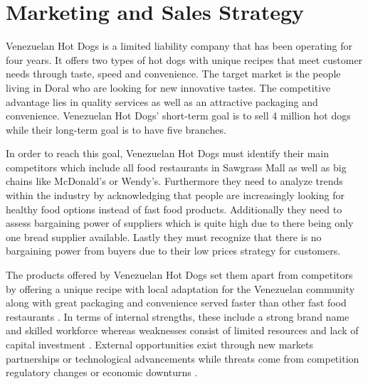 

\section{Marketing and Sales Strategy}\label{sec:marketing_sales}
Venezuelan Hot Dogs is a limited liability company that has been operating for four years. It offers two types of hot dogs with unique recipes that meet customer needs through taste, speed and convenience. The target market is the people living in Doral who are looking for new innovative tastes. The competitive advantage lies in quality services as well as an attractive packaging and convenience. Venezuelan Hot Dogs' short-term goal is to sell 4 million hot dogs while their long-term goal is to have five branches. 

In order to reach this goal, Venezuelan Hot Dogs must identify their main competitors which include all food restaurants in Sawgrass Mall as well as big chains like McDonald's or Wendy's. Furthermore they need to analyze trends within the industry by acknowledging that people are increasingly looking for healthy food options instead of fast food products. Additionally they need to assess bargaining power of suppliers which is quite high due to there being only one bread supplier available. Lastly they must recognize that there is no bargaining power from buyers due to their low prices strategy for customers. 

The products offered by Venezuelan Hot Dogs set them apart from competitors by offering a unique recipe with local adaptation for the Venezuelan community along with great packaging and convenience served faster than other fast food restaurants . In terms of internal strengths, these include a strong brand name and skilled workforce whereas weaknesses consist of limited resources and lack of capital investment . External opportunities exist through new markets partnerships or technological advancements while threats come from competition regulatory changes or economic downturns . 

